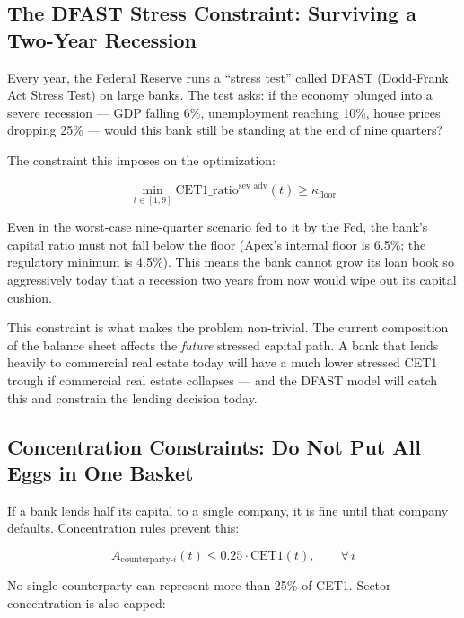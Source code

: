 \documentclass[12pt,a4paper]{article}
\begin{document}
\subsection{The DFAST Stress Constraint: Surviving a Two-Year Recession}

Every year, the Federal Reserve runs a ``stress test'' called DFAST
(Dodd-Frank Act Stress Test) on large banks.  The test asks: if the economy
plunged into a severe recession --- GDP falling 6\%, unemployment reaching 10\%,
house prices dropping 25\% --- would this bank still be standing at the end
of nine quarters?

The constraint this imposes on the optimization:

\begin{equation}
  \min_{t \in [1,9]} \text{CET1\_ratio}^{\text{sev\_adv}}(t) \geq \kappa_{\text{floor}}
  \label{eq:dfast}
\end{equation}

\begin{mdframed}[style=plainenglish]
Even in the worst-case nine-quarter scenario fed to it by the Fed, the bank's
capital ratio must not fall below the floor (Apex's internal floor is 6.5\%;
the regulatory minimum is 4.5\%).  This means the bank cannot grow its loan
book so aggressively today that a recession two years from now would wipe out
its capital cushion.
\end{mdframed}

This constraint is what makes the problem non-trivial.  The current composition
of the balance sheet affects the \emph{future} stressed capital path.  A bank
that lends heavily to commercial real estate today will have a much lower
stressed CET1 trough if commercial real estate collapses --- and the DFAST
model will catch this and constrain the lending decision today.

\subsection{Concentration Constraints: Do Not Put All Eggs in One Basket}

If a bank lends half its capital to a single company, it is fine until that
company defaults.  Concentration rules prevent this:

\begin{equation}
  A_{\text{counterparty-}i}(t) \leq 0.25 \cdot \text{CET1}(t), \qquad \forall\, i
  \label{eq:conc}
\end{equation}

No single counterparty can represent more than 25\% of CET1.  Sector
concentration is also capped:
\end{document}
